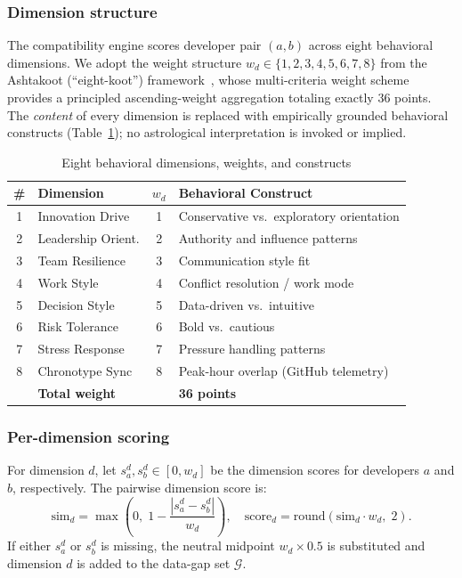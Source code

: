 \documentclass[conference]{IEEEtran}
\newcommand{\set}[1]{\mathcal{#1}}
\begin{document}
\subsubsection*{Dimension structure}
The compatibility engine scores developer pair $(a,b)$ across eight
behavioral dimensions.
We adopt the weight structure $w_d \in \{1,2,3,4,5,6,7,8\}$ from
the Ashtakoot (``eight-koot'') framework~\cite{ashtakoot}, whose
multi-criteria weight scheme provides a principled ascending-weight
aggregation totaling exactly 36 points.
The \emph{content} of every dimension is replaced with empirically
grounded behavioral constructs (Table~\ref{tab:dimensions});
no astrological interpretation is invoked or implied.

\begin{table}[t]
  \caption{Eight behavioral dimensions, weights, and constructs}
  \label{tab:dimensions}
  \centering
  \renewcommand{\arraystretch}{1.15}
  \begin{tabularx}{\linewidth}{@{}c l c X@{}}
    \toprule
    \textbf{\#} & \textbf{Dimension} & \textbf{$w_d$} &
    \textbf{Behavioral Construct} \\
    \midrule
    1 & Innovation Drive    & 1 & Conservative vs.\ exploratory orientation \\
    2 & Leadership Orient.  & 2 & Authority and influence patterns \\
    3 & Team Resilience     & 3 & Communication style fit \\
    4 & Work Style          & 4 & Conflict resolution / work mode \\
    5 & Decision Style      & 5 & Data-driven vs.\ intuitive \\
    6 & Risk Tolerance      & 6 & Bold vs.\ cautious \\
    7 & Stress Response     & 7 & Pressure handling patterns \\
    8 & Chronotype Sync     & 8 & Peak-hour overlap (GitHub telemetry) \\
    \midrule
    & \multicolumn{2}{l}{\textbf{Total weight}} & \textbf{36 points} \\
    \bottomrule
  \end{tabularx}
\end{table}

\subsubsection*{Per-dimension scoring}
For dimension $d$, let $s_a^d, s_b^d \in [0, w_d]$ be the dimension
scores for developers $a$ and $b$, respectively.
The pairwise dimension score is:
\begin{equation}
  \mathrm{sim}_d = \max\!\left(0,\;1-\frac{|s_a^d - s_b^d|}{w_d}\right),\quad
  \mathrm{score}_d = \mathrm{round}(\mathrm{sim}_d \cdot w_d,\;2).
  \label{eq:dimscore}
\end{equation}
If either $s_a^d$ or $s_b^d$ is missing, the neutral midpoint
$w_d \times 0.5$ is substituted and dimension $d$ is added to the
data-gap set $\set{G}$.
\end{document}
